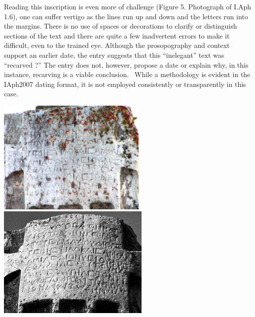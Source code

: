 \documentclass[amsthm,ebook]{saparticle}
\begin{document}
\bigskip


\bigskip


\bigskip


\bigskip


\bigskip


\bigskip

Reading this inscription is even more of challenge (Figure 5. Photograph of I.Aph 1.6), one can suffer vertigo as the
lines run up and down and the letters run into the margins. There is no use of spaces or decorations to clarify or
distinguish sections of the text and there are quite a few inadvertent errors to make it difficult, even to the trained
eye. Although the prosopography and context support an earlier date, the entry suggests that this “inelegant” text was
“recarved ?” The entry does not, however, propose a date or explain why, in this instance, recarving is a viable
conclusion. \ While a methodology is evident in the IAph2007 dating format, it is not employed consistently or
transparently in this case. \ 


\bigskip


\bigskip


\bigskip

 \includegraphics[width=7.23cm,height=5.549cm]{PaperproposalforEAGLEfinal-img005.jpg} 
\includegraphics[width=7.396cm,height=5.456cm]{PaperproposalforEAGLEfinal-img006.jpg} 


\bigskip


\bigskip
\end{document}
